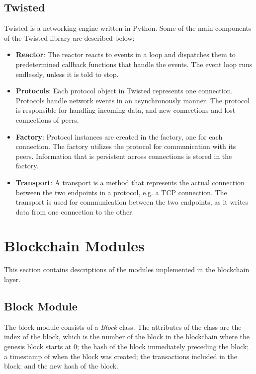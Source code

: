 \subsection{Twisted}
Twisted \cite{twisted} is a networking engine written in Python.
Some of the main components of the Twisted library are described below:
\begin{itemize}
\item \textbf{Reactor}: The reactor reacts to events in a loop and dispatches them to predetermined callback functions that handle the events. The event loop runs endlessly, unless it is told to stop. 

\item \textbf{Protocols}: Each protocol object in Twisted represents one connection. Protocols handle network events in an asynchronously manner. The protocol is responsible for handling incoming data, and new connections and lost connections of peers.

\item \textbf{Factory}: Protocol instances are created in the factory, one for each connection. The factory utilizes the protocol for communication with its peers. Information that is persistent across connections is stored in the factory.

\item \textbf{Transport}: A transport is a method that represents the actual connection between the two endpoints in a protocol, e.g. a TCP connection. The transport is used for communication between the two endpoints, as it writes data from one connection to the other.
\end{itemize}


\section{Blockchain Modules}
This section contains descriptions of the modules implemented in the blockchain layer.

\subsection{Block Module}
The block module consists of a \textit{Block} class. The attributes of the class are the index of the block, which is the number of the block in the blockchain where the genesis block starts at 0; the hash of the block immediately preceding the block; a timestamp of when the block was created; the transactions included in the block; and the new hash of the block. 

